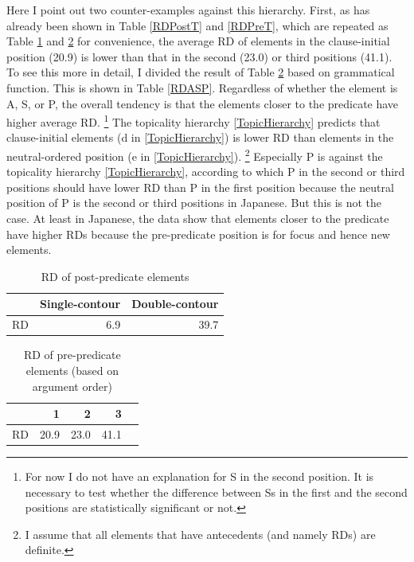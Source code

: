 Here I point out two counter-examples against this hierarchy.
First,
as has already been shown in Table \ref{RDPostT} and \ref{RDPreT},
which are repeated as Table \ref{RDPostT2} and \ref{RDPreT2} for convenience,
the average RD of elements in the clause-initial position (20.9) is lower than that in the second (23.0) or third positions (41.1).
To see this more in detail,
I divided the result of Table \ref{RDPreT2} based on grammatical function.
This is shown in Table \ref{RDASP}.
Regardless of whether the element is A, S, or P,
the overall tendency is that
the elements closer to the predicate have higher average RD.%
 \footnote{
 For now I do not have an explanation for S in the second position.
 It is necessary to test whether the difference between Ss in the first and the second positions are statistically significant or not.
 }
The topicality hierarchy \ref{TopicHierarchy} predicts that
clause-initial elements (d in \ref{TopicHierarchy}) is lower RD than elements in the neutral-ordered position (e in \ref{TopicHierarchy}).%
	\footnote{
	I assume that all elements that have antecedents (and namely RDs) are definite.
	}
Especially P is against the topicality hierarchy \ref{TopicHierarchy},
according to which P in the second or third positions should have lower RD than P in the first position because the neutral position of P is the second or third positions in Japanese.
But this is not the case.
At least in Japanese,
the data show that
elements closer to the predicate have higher RDs
because the pre-predicate position is for focus and hence new elements.

\begin{table}[bht]
\centering
\caption{RD of post-predicate elements}
\begin{tabular}{lrr}
\toprule
  & Single-contour & Double-contour \\
\midrule
RD & 6.9 & 39.7 \\
\bottomrule
\end{tabular}
\label{RDPostT2}
\end{table}
\begin{table}
\centering
\caption{RD of pre-predicate elements (based on argument order)}
\begin{tabular}{lrrrr}
\toprule
  &  1  & 2 & 3 \\
\midrule
RD & 20.9 & 23.0 & 41.1 \\
\bottomrule
\end{tabular}
\label{RDPreT2}
\end{table}

